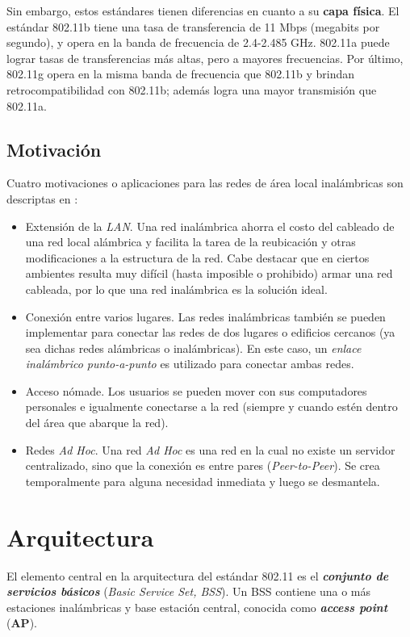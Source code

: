 Sin embargo, estos estándares tienen diferencias en cuanto a su \textbf{capa física}. El estándar 802.11b tiene una tasa de transferencia de 11 Mbps (megabits por segundo), y opera en la banda de frecuencia de 2.4-2.485 GHz. 802.11a puede lograr tasas de transferencias más altas, pero a mayores frecuencias. Por último, 802.11g opera en la misma banda de frecuencia que 802.11b y brindan retrocompatibilidad con 802.11b; además logra una mayor transmisión que 802.11a. 

\subsection{Motivación}

Cuatro motivaciones o aplicaciones para las redes de área local inalámbricas son descriptas en \autocite{Stallings:Wireless}:

\begin{itemize}
    \item Extensión de la \emph{LAN}. Una red inalámbrica ahorra el costo del cableado de una red local alámbrica y facilita la tarea de la reubicación y otras modificaciones a la estructura de la red. Cabe destacar que en ciertos ambientes resulta muy difícil (hasta imposible o prohibido) armar una red cableada, por lo que una red inalámbrica es la solución ideal.
    \item Conexión entre varios lugares. Las redes inalámbricas también se pueden implementar para conectar las redes de dos lugares o edificios cercanos (ya sea dichas redes alámbricas o inalámbricas). En este caso, un \emph{enlace inalámbrico punto-a-punto} es utilizado para conectar ambas redes. 
    \item Acceso nómade. Los usuarios se pueden mover con sus computadores personales e igualmente conectarse a la red (siempre y cuando estén dentro del área que abarque la red).
    \item Redes \emph{Ad Hoc}. Una red \emph{Ad Hoc} es una red en la cual no existe un servidor centralizado, sino que la conexión es entre pares (\emph{Peer-to-Peer}). Se crea temporalmente para alguna necesidad inmediata y luego se desmantela. 
\end{itemize}


\section{Arquitectura}

El elemento central en la arquitectura del estándar 802.11 es el \emph{\textbf{conjunto de servicios básicos}} (\emph{Basic Service Set, BSS}). Un BSS contiene una o más estaciones inalámbricas y base estación central, conocida como \emph{\textbf{access point}} (\textbf{AP}).

